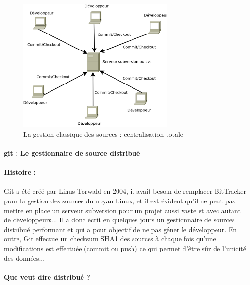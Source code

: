 \begin{figure}[H]
\begin{center}
        \includegraphics[width=0.7\textwidth]{../images/svn.png}
\caption{La gestion classique des sources : centralisation totale }
\label{svn}
\end{center}
\end{figure}


\paragraph{git : Le gestionnaire de source distribué}
\label{gitPar}
\paragraph{Histoire :}
\paragraph{} Git a été créé par Linus Torwald en 2004, il avait besoin de remplacer BitTracker pour la gestion des sources du noyau Linux, et il est évident qu'il ne peut pas mettre en place un serveur subversion pour un projet aussi vaste et avec autant de développeurs... Il a donc écrit en quelques jours un gestionnaire de sources distribué performant et qui a pour objectif de ne pas géner le développeur. En outre, Git effectue un checksum SHA1 des sources à chaque fois qu'une modifications est effectuée (commit ou push) ce qui permet d'être sûr de l'unicité des données...

\paragraph{Que veut dire distribué ?} 
